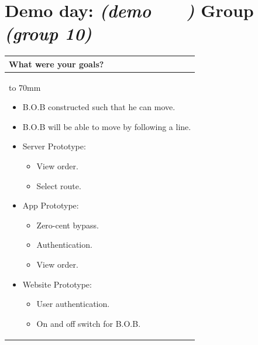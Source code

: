 \documentclass[a4paper]{article}
\newcommand{\colWidth}{141mm}
\begin{document}
 
\section*{Demo day: \textit{(demo   \  \  \  )} Group \textit{(group 10)}}


\begin{center}
\begin{tabular}{|p{\colWidth}|}
	\hline
	\cellcolor{blue!25}\large
	\textbf{What were your goals?}
	\\ \hline
	\vtop to 70mm{
\begin{itemize}
    \item B.O.B constructed such that he can move.
    \item B.O.B will be able to move by following a line.
    \item Server Prototype: 
    \begin{itemize}
        \item View order.
        \item Select route.
    \end{itemize}
    \item App Prototype:
    \begin{itemize}
        \item Zero-cent bypass.
        \item Authentication.
        \item View order.
    \end{itemize}
    \item Website Prototype: 
    \begin{itemize}
        \item User authentication.
        \item On and off switch for B.O.B.
    \end{itemize}
\end{itemize}
  }
  \\
  \hline
\end{tabular}
\vskip 5mm



\end{center}
\end{document}
